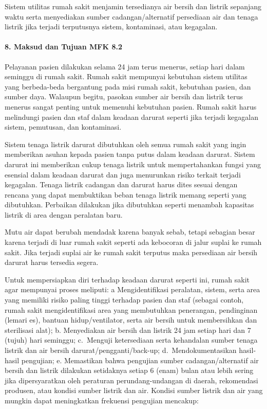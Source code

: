 \documentclass[
]{book}
\begin{document}
Sistem utilitas rumah sakit menjamin tersedianya air bersih dan listrik sepanjang waktu serta menyediakan sumber cadangan/alternatif persediaan air dan tenaga listrik jika terjadi terputusnya sistem, kontaminasi, atau kegagalan.

\hypertarget{maksud-dan-tujuan-mfk-8.2}{%
\paragraph*{8. Maksud dan Tujuan MFK 8.2}\label{maksud-dan-tujuan-mfk-8.2}}

Pelayanan pasien dilakukan selama 24 jam terus menerus, setiap hari dalam seminggu di rumah sakit. Rumah sakit mempunyai kebutuhan sistem utilitas yang berbeda-beda bergantung pada misi rumah sakit, kebutuhan pasien, dan sumber daya. Walaupun begitu, pasokan sumber air bersih dan listrik terus menerus sangat penting untuk memenuhi kebutuhan pasien. Rumah sakit harus melindungi pasien dan staf dalam keadaan darurat seperti jika terjadi kegagalan sistem, pemutusan, dan kontaminasi.

Sistem tenaga listrik darurat dibutuhkan oleh semua rumah sakit yang ingin memberikan asuhan kepada pasien tanpa putus dalam keadaan darurat. Sistem darurat ini memberikan cukup tenaga listrik untuk mempertahankan fungsi yang esensial dalam keadaan darurat dan juga menurunkan risiko terkait terjadi kegagalan. Tenaga listrik cadangan dan darurat harus dites sesuai dengan rencana yang dapat membuktikan beban tenaga listrik memang seperti yang dibutuhkan. Perbaikan dilakukan jika dibutuhkan seperti menambah kapasitas listrik di area dengan peralatan baru.

Mutu air dapat berubah mendadak karena banyak sebab, tetapi sebagian besar karena terjadi di luar rumah sakit seperti ada kebocoran di jalur suplai ke rumah sakit. Jika terjadi suplai air ke rumah sakit terputus maka persediaan air bersih darurat harus tersedia segera.

Untuk mempersiapkan diri terhadap keadaan darurat seperti ini, rumah sakit agar mempunyai proses meliputi:
a Mengidentifikasi peralatan, sistem, serta area yang memiliki risiko paling tinggi terhadap pasien dan staf (sebagai contoh, rumah sakit mengidentifikasi area yang membutuhkan penerangan, pendinginan (lemari es), bantuan hidup/ventilator, serta air bersih untuk membersihkan dan sterilisasi alat);
b. Menyediakan air bersih dan listrik 24 jam setiap hari dan 7 (tujuh) hari seminggu;
c.~Menguji ketersediaan serta kehandalan sumber tenaga listrik dan air bersih darurat/pengganti/back-up;
d.~Mendokumentasikan hasil-hasil pengujian;
e. Memastikan bahwa pengujian sumber cadangan/alternatif air bersih dan listrik dilakukan setidaknya setiap 6 (enam) bulan atau lebih sering jika dipersyaratkan oleh peraturan perundang-undangan di daerah, rekomendasi produsen, atau kondisi sumber listrik dan air. Kondisi sumber listrik dan air yang mungkin dapat meningkatkan frekuensi pengujian mencakup:
\end{document}
